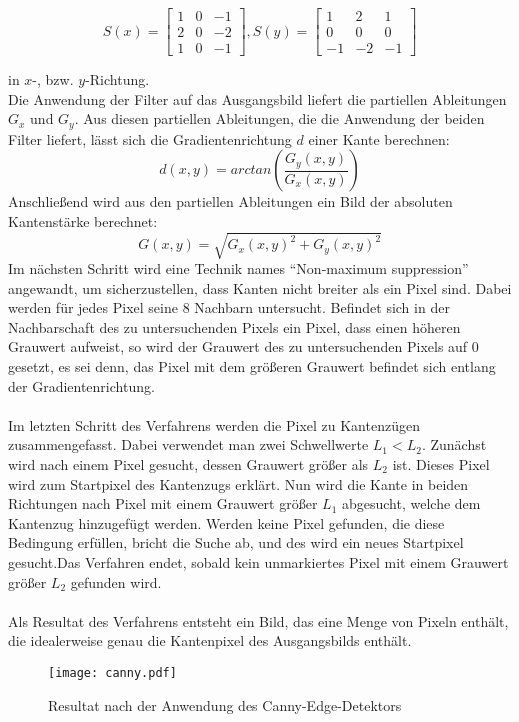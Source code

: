 \begin{equation*}
S(x) = \begin{bmatrix}
1 & 0 & -1\\ 
2 & 0 & -2\\ 
1 & 0 & -1
\end{bmatrix},
S(y) = \begin{bmatrix}
1 & 2 & 1\\ 
0 & 0 & 0\\ 
-1 &-2  &-1 
\end{bmatrix}
\end{equation*}

in $x$-, bzw. $y$-Richtung. \\
Die Anwendung der Filter auf das Ausgangsbild liefert die partiellen Ableitungen $G_x$ und $G_y$.
Aus diesen partiellen Ableitungen, die die Anwendung der beiden Filter liefert, lässt sich die Gradientenrichtung $d$ einer Kante berechnen:
\begin{equation*}
d(x, y) = arctan(\frac{G_y(x, y)}{G_x(x, y)})
\end{equation*}
Anschließend wird aus den partiellen Ableitungen ein Bild der absoluten Kantenstärke berechnet:
\begin{equation*}
G(x, y) = \sqrt{G_x(x, y)^2 + G_y(x, y)^2}
\end{equation*}
Im nächsten Schritt wird eine Technik names “Non-maximum suppression” angewandt, um sicherzustellen, dass Kanten nicht breiter als ein Pixel sind. Dabei werden für jedes Pixel seine 8 Nachbarn untersucht. Befindet sich in der Nachbarschaft des zu untersuchenden Pixels ein Pixel, dass einen höheren Grauwert aufweist, so wird der Grauwert des zu untersuchenden Pixels auf 0 gesetzt, es sei denn, das Pixel mit dem größeren Grauwert befindet sich entlang der Gradientenrichtung. \\ \\
Im letzten Schritt des Verfahrens werden die Pixel zu Kantenzügen zusammengefasst.
Dabei verwendet man zwei Schwellwerte $L_1 < L_2$. Zunächst wird nach einem Pixel gesucht, dessen Grauwert größer als $L_2$ ist. Dieses Pixel wird zum Startpixel des Kantenzugs erklärt. Nun wird die Kante in beiden Richtungen nach Pixel mit einem Grauwert größer $L_1$ abgesucht, welche dem Kantenzug hinzugefügt werden. Werden keine Pixel gefunden, die diese Bedingung erfüllen, bricht die Suche ab, und des wird ein neues Startpixel gesucht.Das Verfahren endet, sobald kein unmarkiertes Pixel mit einem Grauwert größer $L_2$ gefunden wird. \\ \\
Als Resultat des Verfahrens entsteht ein Bild, das eine Menge von Pixeln enthält, die idealerweise genau die Kantenpixel des Ausgangsbilds enthält.
\begin{figure}[H]
  \begin{center}
    \texttt{[image: canny.pdf]}
    \caption{Resultat nach der Anwendung des Canny-Edge-Detektors}
    \label{fig:canny}
  \end{center}
\end{figure}

